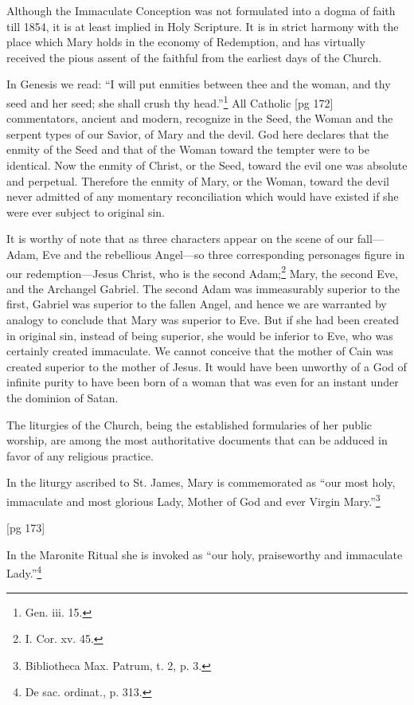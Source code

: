 Although the Immaculate Conception was not
formulated into a dogma of faith till 1854, it is
at least implied in Holy Scripture. It is in strict
harmony with the place which Mary holds in the
economy of Redemption, and has virtually received
the pious assent of the faithful from the
earliest days of the Church.

In Genesis we read: “I will put enmities between
thee and the woman, and thy seed and her
seed; she shall crush thy head.”\footnote{Gen.
iii. 15.} All Catholic
[pg 172]
commentators, ancient and modern, recognize in
the Seed, the Woman and the serpent types of our
Savior, of Mary and the devil. God here declares
that the enmity of the Seed and that of the Woman
toward the tempter were to be identical. Now the
enmity of Christ, or the Seed, toward the evil one
was absolute and perpetual. Therefore the enmity
of Mary, or the Woman, toward the devil
never admitted of any momentary reconciliation
which would have existed if she were ever subject
to original sin.

It is worthy of note that as three characters
appear on the scene of our fall—Adam, Eve and
the rebellious Angel—so three corresponding personages
figure in our redemption—Jesus Christ,
who is the second Adam;\footnote{I. Cor.
xv. 45.} Mary, the second Eve,
and the Archangel Gabriel. The second Adam was
immeasurably superior to the first, Gabriel was
superior to the fallen Angel, and hence we are
warranted by analogy to conclude that Mary was
superior to Eve. But if she had been created in
original sin, instead of being superior, she would
be inferior to Eve, who was certainly created immaculate.
We cannot conceive that the mother of
Cain was created superior to the mother of Jesus.
It would have been unworthy of a God of infinite
purity to have been born of a woman that was
even for an instant under the dominion of Satan.

The liturgies of the Church, being the established
formularies of her public worship, are
among the most authoritative documents that can
be adduced in favor of any religious practice.

In the liturgy ascribed to St. James, Mary is
commemorated as “our most holy, immaculate and
most glorious Lady, Mother of God and ever Virgin
Mary.”\footnote{Bibliotheca Max. Patrum, t. 2, p. 3.}

[pg 173]

In the Maronite Ritual she is invoked as “our
holy, praiseworthy and immaculate Lady.”\footnote{De
sac. ordinat., p. 313.}

